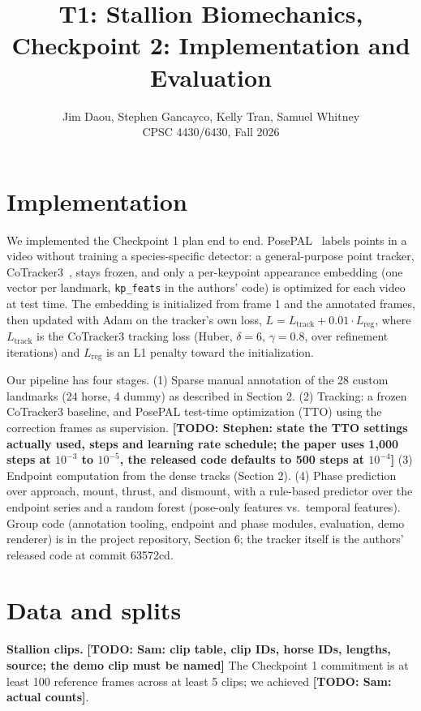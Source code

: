 \documentclass[11pt]{article}
\title{T1: Stallion Biomechanics, Checkpoint 2: Implementation and Evaluation}
\author{Jim Daou, Stephen Gancayco, Kelly Tran, Samuel Whitney\\
CPSC 4430/6430, Fall 2026}
\date{}
\newcommand{\todo}[1]{\textbf{[TODO: #1]}}
\begin{document}
\maketitle
\vspace{-1.5em}

\section{Implementation}

We implemented the Checkpoint 1 plan end to end. PosePAL~\cite{posepal}
labels points in a video without training a species-specific detector:
a general-purpose point tracker, CoTracker3~\cite{cotracker3}, stays
frozen, and only a per-keypoint appearance embedding (one vector per
landmark, \texttt{kp\_feats} in the authors' code) is optimized for each
video at test time. The embedding is initialized from frame 1 and the
annotated frames, then updated with Adam on the tracker's own loss,
$L = L_{\text{track}} + 0.01 \cdot L_{\text{reg}}$, where
$L_{\text{track}}$ is the CoTracker3 tracking loss (Huber, $\delta = 6$,
$\gamma = 0.8$, over refinement iterations) and $L_{\text{reg}}$ is an
L1 penalty toward the initialization.

Our pipeline has four stages. (1) Sparse manual annotation of the 28
custom landmarks (24 horse, 4 dummy) as described in Section 2.
(2) Tracking: a frozen CoTracker3 baseline, and PosePAL test-time
optimization (TTO) using the correction frames as supervision.
\todo{Stephen: state the TTO settings actually used, steps and learning
rate schedule; the paper uses 1{,}000 steps at $10^{-3}$ to $10^{-5}$,
the released code defaults to 500 steps at $10^{-4}$}
(3) Endpoint computation from the dense tracks (Section 2).
(4) Phase prediction over approach, mount, thrust, and dismount, with a
rule-based predictor over the endpoint series and a random forest
(pose-only features vs.\ temporal features). Group code (annotation
tooling, endpoint and phase modules, evaluation, demo renderer) is in
the project repository, Section 6; the tracker itself is the authors'
released code at commit 63572cd.

\section{Data and splits}

\textbf{Stallion clips.} \todo{Sam: clip table, clip IDs, horse IDs,
lengths, source; the demo clip must be named} The Checkpoint 1
commitment is at least 100 reference frames across at least 5 clips;
we achieved \todo{Sam: actual counts}.
\end{document}
